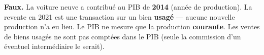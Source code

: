 
\begin{reponse}
\textbf{Faux.} La voiture neuve a contribué au PIB de \textbf{2014} (année de production). La revente en 2021 est une transaction sur un bien \textbf{usagé} --- aucune nouvelle production n'a eu lieu. Le PIB ne mesure que la production \textbf{courante}. Les ventes de biens usagés ne sont pas comptées dans le PIB (seule la commission d'un éventuel intermédiaire le serait).
\end{reponse}


